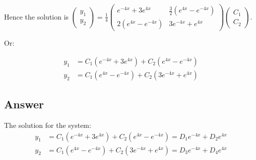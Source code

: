 Hence the solution is $\begin{pmatrix} y_1 \\ y_2 \end{pmatrix} = \frac{1}{4} \begin{pmatrix} e^{-4x} + 3e^{4x} & \frac{3}{2} (e^{4x} - e^{-4x}) \\ 2(e^{4x} - e^{-4x}) & 3e^{-4x} + e^{4x} \end{pmatrix} \begin{pmatrix} C_1 \\ C_2 \end{pmatrix}$.

Or:

\begin{displaymath}
    \begin{aligned}
        y_1 & = C_1(e^{-4x} + 3e^{4x}) + C_2(e^{4x} - e^{-4x}) \\
        y_2 & = C_1(e^{4x} - e^{-4x}) + C_2(3e^{-4x} + e^{4x})
    \end{aligned}
\end{displaymath}

\subsection*{Answer}

The solution for the system: 
\begin{displaymath}
    \begin{aligned}
        y_1 & = C_1(e^{-4x} + 3e^{4x}) + C_2(e^{4x} - e^{-4x}) = D_1e^{-4x} + D_2e^{4x} \\
        y_2 & = C_1(e^{4x} - e^{-4x}) + C_2(3e^{-4x} + e^{4x}) = D_3e^{-4x} + D_4e^{4x}
    \end{aligned}
\end{displaymath}